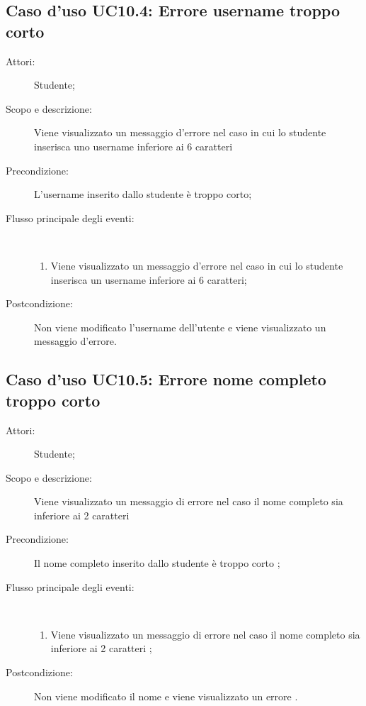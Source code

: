 \subsection{Caso d'uso UC10.4: Errore username troppo corto}\begin{description}
	\item[Attori:] Studente;
	\item[Scopo e descrizione:] Viene visualizzato un messaggio d'errore nel caso in cui lo studente inserisca uno username inferiore ai 6 caratteri
	\item[Precondizione:] L'username inserito dallo studente è troppo corto;
	
	\item[Flusso principale degli eventi:] \ 
	\begin{enumerate}
		\item Viene visualizzato un messaggio d'errore nel caso in cui lo studente inserisca un username inferiore ai 6 caratteri;
		
	\end{enumerate}
	\item[Postcondizione:] Non viene modificato l'username dell'utente e viene visualizzato un messaggio d'errore.
\end{description}
\hypertarget{UC10.5}{}
\subsection{Caso d'uso UC10.5: Errore nome completo troppo corto}\begin{description}
	\item[Attori:] Studente;
	\item[Scopo e descrizione:] Viene visualizzato un messaggio di errore nel caso il nome completo sia inferiore ai 2 caratteri
	
	\item[Precondizione:] Il nome completo inserito dallo studente è troppo corto
	;
	
	\item[Flusso principale degli eventi:] \ 
	\begin{enumerate}
		\item Viene visualizzato un messaggio di errore nel caso il nome completo sia inferiore ai 2 caratteri	;
		
	\end{enumerate}
	\item[Postcondizione:] Non viene modificato il nome e viene visualizzato un errore
	.
\end{description}
\hypertarget{UC10.6}{}
